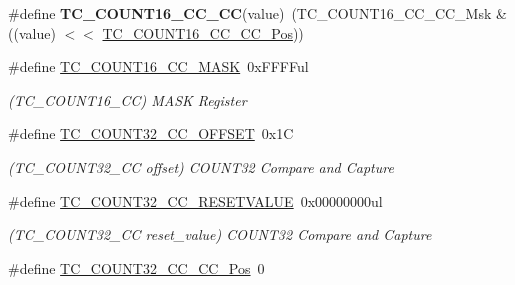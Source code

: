 \begin{DoxyCompactItemize}
\item 
\hypertarget{group___s_a_m_l21___t_c_gaf08d377c84ae13ef7dcea891c42884c4}{}\#define {\bfseries T\+C\+\_\+\+C\+O\+U\+N\+T16\+\_\+\+C\+C\+\_\+\+C\+C}(value)~(T\+C\+\_\+\+C\+O\+U\+N\+T16\+\_\+\+C\+C\+\_\+\+C\+C\+\_\+\+Msk \& ((value) $<$$<$ \hyperlink{group___s_a_m_l21___t_c_ga5412aca6343897cc3c3b5cf4b325b30f}{T\+C\+\_\+\+C\+O\+U\+N\+T16\+\_\+\+C\+C\+\_\+\+C\+C\+\_\+\+Pos}))\label{group___s_a_m_l21___t_c_gaf08d377c84ae13ef7dcea891c42884c4}

\item 
\hypertarget{group___s_a_m_l21___t_c_ga702b7c8d5e9223806b2f2e8c52bb73c7}{}\#define \hyperlink{group___s_a_m_l21___t_c_ga702b7c8d5e9223806b2f2e8c52bb73c7}{T\+C\+\_\+\+C\+O\+U\+N\+T16\+\_\+\+C\+C\+\_\+\+M\+A\+S\+K}~0x\+F\+F\+F\+Ful\label{group___s_a_m_l21___t_c_ga702b7c8d5e9223806b2f2e8c52bb73c7}

\begin{DoxyCompactList}\small\item\em (T\+C\+\_\+\+C\+O\+U\+N\+T16\+\_\+\+C\+C) M\+A\+S\+K Register \end{DoxyCompactList}\item 
\hypertarget{group___s_a_m_l21___t_c_ga949309ec2ca3fc4d751f1b021c75a99b}{}\#define \hyperlink{group___s_a_m_l21___t_c_ga949309ec2ca3fc4d751f1b021c75a99b}{T\+C\+\_\+\+C\+O\+U\+N\+T32\+\_\+\+C\+C\+\_\+\+O\+F\+F\+S\+E\+T}~0x1\+C\label{group___s_a_m_l21___t_c_ga949309ec2ca3fc4d751f1b021c75a99b}

\begin{DoxyCompactList}\small\item\em (T\+C\+\_\+\+C\+O\+U\+N\+T32\+\_\+\+C\+C offset) C\+O\+U\+N\+T32 Compare and Capture \end{DoxyCompactList}\item 
\hypertarget{group___s_a_m_l21___t_c_ga491a3e923045fb5ed9428871514b3c81}{}\#define \hyperlink{group___s_a_m_l21___t_c_ga491a3e923045fb5ed9428871514b3c81}{T\+C\+\_\+\+C\+O\+U\+N\+T32\+\_\+\+C\+C\+\_\+\+R\+E\+S\+E\+T\+V\+A\+L\+U\+E}~0x00000000ul\label{group___s_a_m_l21___t_c_ga491a3e923045fb5ed9428871514b3c81}

\begin{DoxyCompactList}\small\item\em (T\+C\+\_\+\+C\+O\+U\+N\+T32\+\_\+\+C\+C reset\+\_\+value) C\+O\+U\+N\+T32 Compare and Capture \end{DoxyCompactList}\item 
\hypertarget{group___s_a_m_l21___t_c_gae28461f5839eb01e80a6379fe7faf924}{}\#define \hyperlink{group___s_a_m_l21___t_c_gae28461f5839eb01e80a6379fe7faf924}{T\+C\+\_\+\+C\+O\+U\+N\+T32\+\_\+\+C\+C\+\_\+\+C\+C\+\_\+\+Pos}~0\label{group___s_a_m_l21___t_c_gae28461f5839eb01e80a6379fe7faf924}


\end{DoxyCompactItemize}
